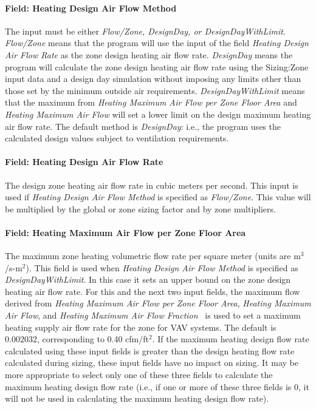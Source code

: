\paragraph{Field: Heating Design Air Flow Method}\label{field-heating-design-air-flow-method}

The input must be either \emph{Flow/Zone, DesignDay, or DesignDayWithLimit}. \emph{Flow/Zone} means that the program will use the input of the field \emph{Heating Design Air Flow Rate} as the zone design heating air flow rate. \emph{DesignDay} means the program will calculate the zone design heating air flow rate using the Sizing:Zone input data and a design day simulation without imposing any limits other than those set by the minimum outside air requirements. \emph{DesignDayWithLimit} means that the maximum from \emph{Heating Maximum Air Flow per Zone Floor Area} and \emph{Heating Maximum Air Flow} will set a lower limit on the design maximum heating air flow rate. The default method is \emph{DesignDay}: i.e., the program uses the calculated design values subject to ventilation requirements.

\paragraph{Field: Heating Design Air Flow Rate}\label{field-heating-design-air-flow-rate}

The design zone heating air flow rate in cubic meters per second. This input is used if \emph{Heating Design Air Flow Method} is specified as \emph{Flow/Zone}. This value will be multiplied by the global or zone sizing factor and by zone multipliers.

\paragraph{Field: Heating Maximum Air Flow per Zone Floor Area}\label{field-heating-maximum-air-flow-per-zone-floor-area}

The maximum zone heating volumetric flow rate per square meter (units are m\(^{3}\)/s-m\(^{2}\)). This field is used when \emph{Heating Design Air Flow Method} is specified as \emph{DesignDayWithLimit}. In this case it sets an upper bound on the zone design heating air flow rate. For this and the next two input fields, the maximum flow derived from \emph{Heating Maximum Air Flow per Zone Floor Area}, \emph{Heating Maximum Air Flow}, and \emph{Heating Maximum Air Flow Fraction}~ is used to set a maximum heating supply air flow rate for the zone for VAV systems. The default is 0.002032, corresponding to 0.40 cfm/ft\(^{2}\). If the maximum heating design flow rate calculated using these input fields is greater than the design heating flow rate calculated during sizing, these input fields have no impact on sizing. It may be more appropriate to select only one of these three fields to calculate the maximum heating design flow rate (i.e., if one or more of these three fields is 0, it will not be used in calculating the maximum heating design flow rate).

